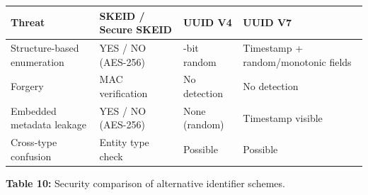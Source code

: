 \documentclass[a4paper,fleqn]{cas-sc}
\newcounter{none}
\begin{document}
{\def\LTcaptype{none} %
\begin{longtable}[]{@{}
  >{\raggedright\arraybackslash}p{}
  >{\raggedright\arraybackslash}p{}
  >{\raggedright\arraybackslash}p{}
  >{\raggedright\arraybackslash}p{}@{}}
\toprule\noalign{}
\begin{minipage}[b]{\linewidth}\raggedright
Threat
\end{minipage} & \begin{minipage}[b]{\linewidth}\raggedright
SKEID / Secure SKEID
\end{minipage} & \begin{minipage}[b]{\linewidth}\raggedright
UUID V4
\end{minipage} & \begin{minipage}[b]{\linewidth}\raggedright
UUID V7
\end{minipage} \\
\midrule\noalign{}
\endhead
\bottomrule\noalign{}
\endlastfoot
Structure-based enumeration & YES / NO (AES-256) & 122-bit random &
Timestamp + random/monotonic fields \\
Forgery & MAC verification & No detection & No detection \\
Embedded metadata leakage & YES / NO (AES-256) & None (random) &
Timestamp visible \\
Cross-type confusion & Entity type check & Possible & Possible \\
\end{longtable}
}

\textbf{Table 10:} Security comparison of alternative identifier
schemes.
\end{document}
